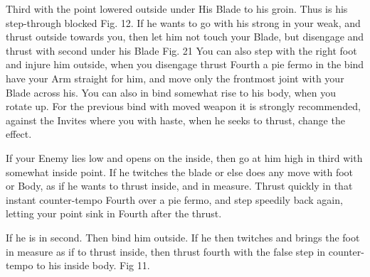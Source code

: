 \newpage


\newpage



Third with the point lowered outside under His Blade to his
groin. Thus is his step-through blocked Fig. 12. If he wants to go
with his strong in your weak, and thrust outside towards you, then let
him not touch your Blade, but disengage and thrust with second under
his Blade Fig. 21 You can also step with the right foot and injure him
outside, when you disengage thrust Fourth a pie fermo in the bind
have your Arm straight for him, and move only the frontmost joint with
your Blade across
his. You can also in bind somewhat rise to his body, when you rotate
up. For the previous bind with moved weapon it is strongly
recommended, against the Invites where you with haste, when he seeks
to thrust, change the effect.

\exercise{}


If your Enemy lies low and opens on the inside, then go at him high in
third with somewhat inside point. If he twitches the blade or else
does any move with foot or Body, as if he wants to thrust inside, and
in measure. Thrust quickly in that instant counter-tempo Fourth over a
pie fermo, and step speedily back again, letting your point sink in
Fourth after the thrust.

\exercise{}


If he is in second. Then bind him outside. If he then twitches and
brings the foot in measure as if to thrust inside, then thrust fourth
with the false step in counter-tempo to his inside body. Fig 11.
